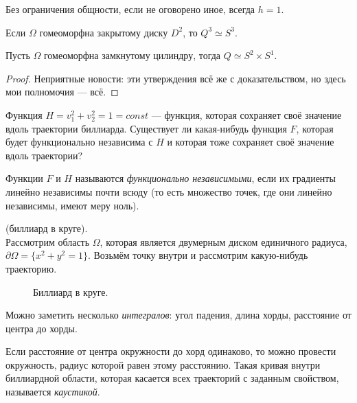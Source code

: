 \begin{remark}
    Без ограничения общности, если не оговорено иное, всегда $h=1$.
\end{remark}

\begin{statement}
    Если $\Omega$ гомеоморфна закрытому диску $D^2$, то $Q^3 \simeq S^3$.
\end{statement} 

\begin{statement}
    Пусть $\Omega$ гомеоморфна замкнутому цилиндру, тогда $Q \simeq S^2 \times S^1$.
\end{statement} 
\begin{proof}
    Неприятные новости: эти утверждения всё же с доказательством, но здесь мои полномочия — всё.
\end{proof} 

Функция $H = v_1^2 + v_2^2 = 1 = const$ — функция, которая сохраняет своё значение вдоль траектории биллиарда. Существует ли какая-нибудь функция $F$, которая будет функционально независима с $H$ и которая тоже сохраняет своё значение вдоль траектории?

\begin{definition}
    Функции $F$ и $H$ называются \textit{функционально независимыми}, если их градиенты линейно независимы почти всюду (то есть множество точек, где они линейно независимы, имеют меру ноль).
\end{definition} 


\begin{example}(биллиард в круге).\\
    Рассмотрим область $\Omega$, которая является двумерным диском единичного радиуса, $\partial \Omega = \{x^2+y^2=1\}$. Возьмём точку внутри и рассмотрим какую-нибудь траекторию.

    \begin{figure}[ht]
        \centering
        \caption{Биллиард в круге.}
        \label{fig:c15.3}
    \end{figure}

    Можно заметить несколько \textit{интегралов}: угол падения, длина хорды, расстояние от центра до хорды.

    Если расстояние от центра окружности до хорд одинаково, то можно провести окружность, радиус которой равен этому расстоянию. Такая кривая внутри биллиардной области, которая касается всех траекторий с заданным свойством, называется \textit{каустикой}.
\end{example}

